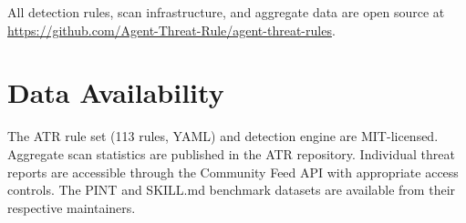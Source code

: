 \documentclass[letterpaper,twocolumn,10pt]{article}
\begin{document}
All detection rules, scan infrastructure, and aggregate data are open
source at \url{https://github.com/Agent-Threat-Rule/agent-threat-rules}.

\section*{Data Availability}

The ATR rule set (113 rules, YAML) and detection engine are MIT-licensed.
Aggregate scan statistics are published in the ATR repository.
Individual threat reports are accessible through the Community Feed API
with appropriate access controls.  The PINT and SKILL.md benchmark
datasets are available from their respective maintainers.


\end{document}
